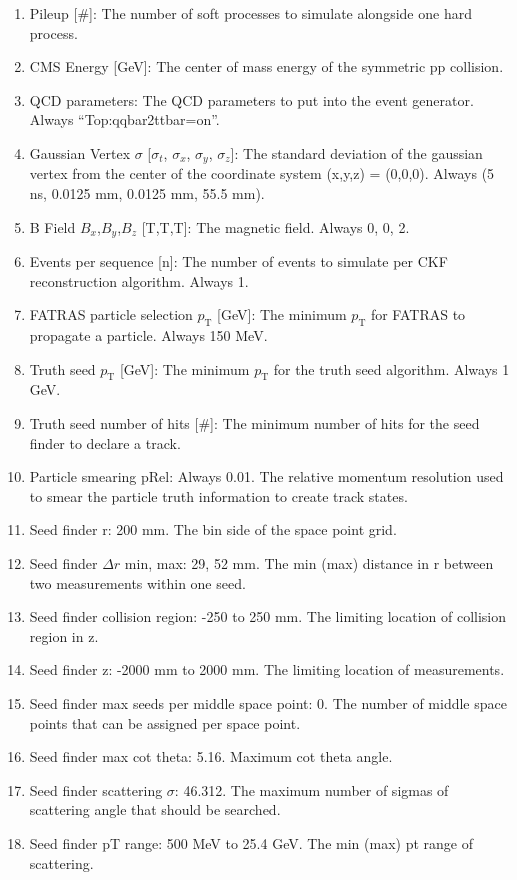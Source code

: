 \documentclass{article}
\newcommand{\pt}[0]{p_\textrm{T}}
\begin{document}
\begin{enumerate}
\item Pileup [\#]: The number of soft processes to simulate alongside one hard process.
\item CMS Energy [GeV]: The center of mass energy of the symmetric pp collision.
\item QCD parameters: The QCD parameters to put into the event generator. Always ``Top:qqbar2ttbar=on''.
\item Gaussian Vertex $\sigma$ [$\sigma_t$, $\sigma_x$, $\sigma_y$, $\sigma_z$]: The standard deviation of the gaussian vertex from the center of the coordinate system (x,y,z) = (0,0,0). Always (5 ns, 0.0125 mm, 0.0125 mm, 55.5 mm).
\item B Field $B_x$,$B_y$,$B_z$ [T,T,T]: The magnetic field. Always 0, 0, 2.
\item Events per sequence [n]: The number of events to simulate per CKF reconstruction algorithm. Always 1.
\item FATRAS particle selection $\pt$ [GeV]: The minimum $\pt$ for FATRAS to propagate a particle. Always 150 MeV.
\item Truth seed $\pt$ [GeV]: The minimum $\pt$ for the truth seed algorithm. Always 1 GeV.
\item Truth seed number of hits [\#]: The minimum number of hits for the seed finder to declare a track.
\item Particle smearing pRel: Always 0.01. The relative momentum resolution used to smear the particle truth information to create track states.
\item Seed finder r: 200 mm. The bin side of the space point grid.
\item Seed finder $\Delta r$ min, max: 29, 52 mm. The min (max) distance in r between two measurements within one seed.
\item Seed finder collision region: -250 to 250 mm. The limiting location of collision region in z.
\item Seed finder z: -2000 mm to 2000 mm. The limiting location of measurements.
\item Seed finder max seeds per middle space point: 0. The number of middle space points that can be assigned per space point.
\item Seed finder max cot theta: 5.16. Maximum cot theta angle.
\item Seed finder scattering $\sigma$: 46.312. The maximum number of sigmas of scattering angle that should be searched.
\item Seed finder pT range: 500 MeV to 25.4 GeV. The min (max) pt range of scattering.

\end{enumerate}
\end{document}
